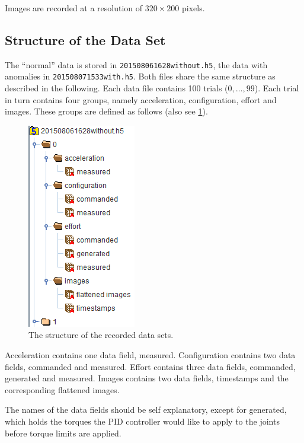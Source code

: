 \documentclass{scrartcl}
\begin{document}
        Images are recorded at a resolution of $320\times 200$ pixels.
    
    \subsection{Structure of the Data Set}
        The ``normal'' data is stored in \texttt{201508061628without.h5}, the data with anomalies in \texttt{201508071533with.h5}.
        Both files share the same structure as described in the following.
        Each data file contains 100 trials ($0, \ldots, 99$).
        Each trial in turn contains four groups, namely acceleration, configuration, effort and images.
        These groups are defined as follows (also see \cref{fig:h5}).
        \begin{figure}
            \centering
            \includegraphics[width=.2\textwidth]{figs/h5}
            \caption{The structure of the recorded data sets.}
            \label{fig:h5}
        \end{figure}
        Acceleration contains one data field, measured.
        Configuration contains two data fields, commanded and measured.
        Effort contains three data fields, commanded, generated and measured.
        Images contains two data fields, timestamps and the corresponding flattened images.
        
        The names of the data fields should be self explanatory, except for generated, which holds the torques the PID controller would like to apply to the joints before torque limits are applied.
\end{document}

